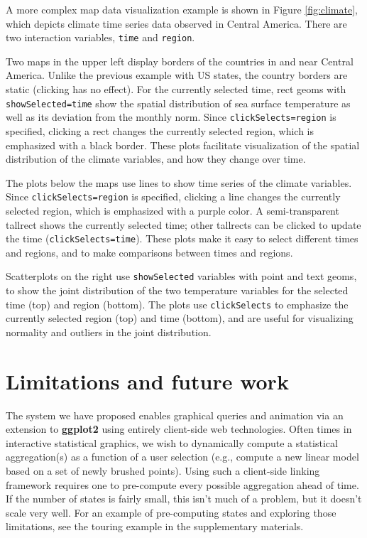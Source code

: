 \documentclass[12pt,]{article}
\theoremstyle{definition}
\theoremstyle{definition}
\theoremstyle{definition}
\theoremstyle{remark}
\begin{document}
A more complex map data visualization example is shown in Figure
\ref{fig:climate}, which depicts climate time series data observed in
Central America. There are two interaction variables, \texttt{time} and
\texttt{region}.

Two maps in the upper left display borders of the countries in and near
Central America. Unlike the previous example with US states, the country
borders are static (clicking has no effect). For the currently selected
time, rect geoms with \texttt{showSelected=time} show the spatial
distribution of sea surface temperature as well as its deviation from
the monthly norm. Since \texttt{clickSelects=region} is specified,
clicking a rect changes the currently selected region, which is
emphasized with a black border. These plots facilitate visualization of
the spatial distribution of the climate variables, and how they change
over time.

The plots below the maps use lines to show time series of the climate
variables. Since \texttt{clickSelects=region} is specified, clicking a
line changes the currently selected region, which is emphasized with a
purple color. A semi-transparent tallrect shows the currently selected
time; other tallrects can be clicked to update the time
(\texttt{clickSelects=time}). These plots make it easy to select
different times and regions, and to make comparisons between times and
regions.

Scatterplots on the right use \texttt{showSelected} variables with point
and text geoms, to show the joint distribution of the two temperature
variables for the selected time (top) and region (bottom). The plots use
\texttt{clickSelects} to emphasize the currently selected region (top)
and time (bottom), and are useful for visualizing normality and outliers
in the joint distribution.

\hypertarget{limitations}{%
\section{Limitations and future work}\label{limitations}}

The system we have proposed enables graphical queries and animation via
an extension to \textbf{ggplot2} using entirely client-side web
technologies. Often times in interactive statistical graphics, we wish
to dynamically compute a statistical aggregation(s) as a function of a
user selection (e.g., compute a new linear model based on a set of newly
brushed points). Using such a client-side linking framework requires one
to pre-compute every possible aggregation ahead of time. If the number
of states is fairly small, this isn't much of a problem, but it doesn't
scale very well. For an example of pre-computing states and exploring
those limitations, see the touring example in the supplementary
materials.
\end{document}
